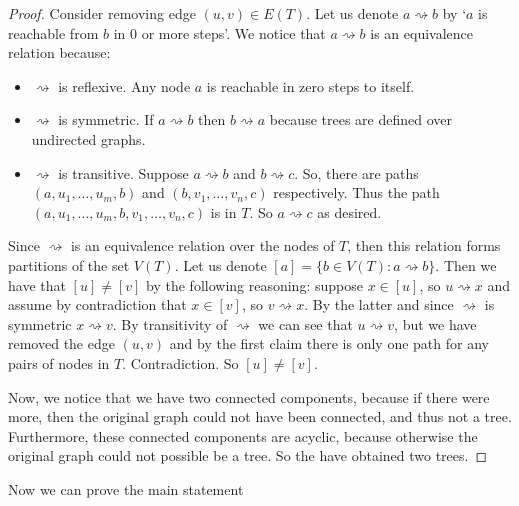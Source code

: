 \documentclass[a4paper, 11pt]{article}
\begin{document}
\begin{proof}
	Consider removing edge $(u, v) \in E(T)$. Let us denote $a \rightsquigarrow b$ by `$a$ is reachable from $b$ in 0 or more steps'. We notice that $a \rightsquigarrow b$ is an equivalence relation because: 

	\begin{itemize}
		\item [] $\rightsquigarrow$ is reflexive. Any node $a$ is reachable in zero steps to itself.
		\item [] $\rightsquigarrow$ is symmetric. If $a \rightsquigarrow b$ then $b \rightsquigarrow a$ because trees are defined over undirected graphs.
		\item [] $\rightsquigarrow$ is transitive. Suppose $a \rightsquigarrow b$ and $b \rightsquigarrow c$. So, there are paths $(a, u_1, \dots, u_m, b)$ and $(b, v_1, \dots, v_n, c)$ respectively. Thus the path $(a, u_1, \dots, u_m, b, v_1, \dots, v_n, c)$ is in $T$. So $a \rightsquigarrow c$ as desired.  
	\end{itemize}

	Since $\rightsquigarrow$ is an equivalence relation over the nodes of $T$, then this relation forms partitions of the set $V(T)$. Let us denote $[a] = \{ b \in V(T) : a \rightsquigarrow b\}$. Then we have that $[u] \neq [v]$ by the following reasoning: suppose $x \in [u]$, so $u \rightsquigarrow x$ and assume by contradiction that $x \in [v]$, so $v \rightsquigarrow x$. By the latter and since $\rightsquigarrow$ is symmetric $x \rightsquigarrow v$. By transitivity of $\rightsquigarrow$ we can see that $u \rightsquigarrow v$, but we have removed the edge $(u, v)$ and by the first claim there is only one path for any pairs of nodes in $T$. Contradiction. So $[u] \neq [v]$.

	Now, we notice that we have two connected components, because if there were more, then the original graph could not have been connected, and thus not a tree. Furthermore, these connected components are acyclic, because otherwise the original graph could not possible be a tree. So the have obtained two trees. 
\end{proof}

Now we can prove the main statement
\end{document}
